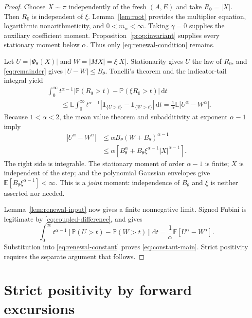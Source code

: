 \documentclass[11pt,a4paper]{article}
\numberwithin{equation}{section}
\theoremstyle{remark}
\newcommand{\E}{\mathbb E}
\newcommand{\Pp}{\mathbb P}
\newcommand{\ind}{\mathbf 1}
\newcommand{\dd}{\,\mathrm d}
\newcommand{\bigabs}[1]{\left|#1\right|}
\begin{document}
\begin{proof}
Choose $X\sim\pi$ independently of the fresh $(A,E)$ and take
$R_0=|X|$. Then $R_0$ is independent of $\xi$. Lemma~\ref{lem:root}
provides the multiplier equation, logarithmic nonarithmeticity, and
$0<m_\alpha<\infty$. Taking $\gamma=0$ supplies the auxiliary coefficient
moment. Proposition~\ref{prop:invariant} supplies every stationary moment
below $\alpha$. Thus only \eqref{eq:renewal-condition} remains.

Let $U=|\Psi_\theta(X)|$ and $W=|MX|=\xi|X|$. Stationarity gives $U$
the law of $R_0$, and \eqref{eq:remainder} gives $|U-W|\le B_\theta$.
Tonelli's theorem and the indicator-tail integral yield
\begin{align}
 &\int_0^\infty t^{\alpha-1}
   \bigabs{\Pp(R_0>t)-\Pp(\xi R_0>t)}\dd t\nonumber\\
 &\hspace{2em}\le
 \E\int_0^\infty t^{\alpha-1}
       |\ind_{\{U>t\}}-\ind_{\{W>t\}}|\dd t
 =\frac1\alpha\E|U^\alpha-W^\alpha|.\label{eq:tail-discrepancy}
\end{align}
Because $1<\alpha<2$, the mean value theorem and subadditivity at
exponent $\alpha-1$ imply
\begin{align}
 |U^\alpha-W^\alpha|
 &\le\alpha B_\theta(W+B_\theta)^{\alpha-1}\nonumber\\
 &\le\alpha\left[B_\theta^\alpha
        +B_\theta\xi^{\alpha-1}|X|^{\alpha-1}\right].
 \label{eq:coupled-difference}
\end{align}
The right side is integrable. The stationary moment of order $\alpha-1$
is finite; $X$ is independent of the step; and the polynomial Gaussian
envelopes give $\E[B_\theta\xi^{\alpha-1}]<\infty$. This is a
\emph{joint} moment: independence of $B_\theta$ and $\xi$ is neither
asserted nor needed.

Lemma~\ref{lem:renewal-input} now gives a finite nonnegative limit.
Signed Fubini is legitimate by \eqref{eq:coupled-difference}, and gives
\begin{equation}
 \int_0^\infty t^{\alpha-1}
       [\Pp(U>t)-\Pp(W>t)]\dd t
 =\frac1\alpha\E[U^\alpha-W^\alpha].\label{eq:signed-fubini}
\end{equation}
Substitution into \eqref{eq:renewal-constant} proves
\eqref{eq:constant-main}. Strict positivity requires the separate
argument that follows.
\end{proof}

\section{Strict positivity by forward excursions}\label{sec:positive}
\end{document}
